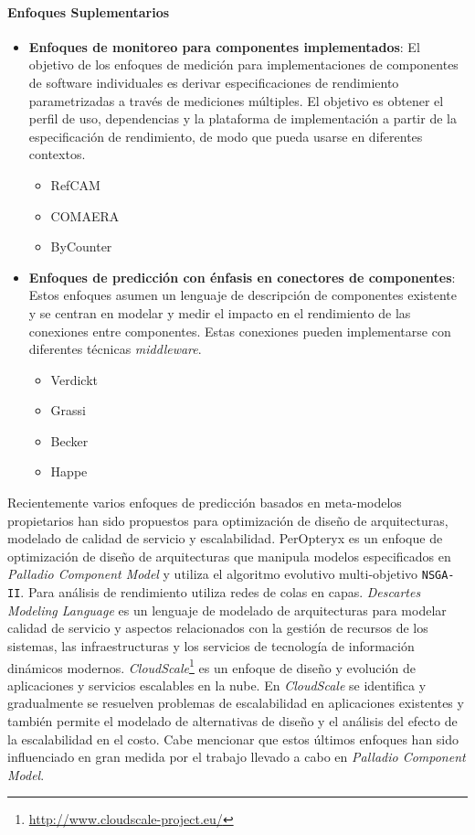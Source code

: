 \paragraph{Enfoques Suplementarios}
\begin{itemize}
    \item \textbf{Enfoques de monitoreo para componentes implementados}: El objetivo de los enfoques de medición para implementaciones de componentes de software individuales es derivar especificaciones de rendimiento parametrizadas a través de mediciones múltiples. El objetivo es obtener el perfil de uso, dependencias y la plataforma de implementación a partir de la especificación de rendimiento, de modo que pueda usarse en diferentes contextos. 
    \begin{itemize}
        \item RefCAM
        \item COMAERA
        \item ByCounter
    \end{itemize}
    \item \textbf{Enfoques de predicción con énfasis en conectores de componentes}: Estos enfoques asumen un lenguaje de descripción de componentes existente y se centran en modelar y medir el impacto en el rendimiento de las conexiones entre componentes. Estas conexiones pueden implementarse con diferentes técnicas \emph{middleware}.
    \begin{itemize}
        \item Verdickt
        \item Grassi
        \item Becker
        \item Happe
    \end{itemize}        
\end{itemize}

Recientemente varios enfoques de predicción basados en meta-modelos propietarios han sido propuestos para optimización de diseño de arquitecturas, modelado de calidad de servicio y escalabilidad. PerOpteryx\cite{Koziolek:2011:PAA:2000259.2000267} es un enfoque de optimización de diseño de arquitecturas que manipula modelos especificados en \emph{Palladio Component Model}\cite{Reussner:2016:MSS:3036121} y utiliza el algoritmo evolutivo multi-objetivo \texttt{NSGA-II}. Para análisis de rendimiento utiliza redes de colas en capas. \emph{Descartes Modeling Language}\cite{KoBrHu2014-TechReport-DML} es un lenguaje de modelado de arquitecturas para modelar calidad de servicio y aspectos relacionados con la gestión de recursos de los sistemas, las infraestructuras y los servicios de tecnología de información dinámicos modernos. \emph{CloudScale}\footnote{\url{http://www.cloudscale-project.eu/}}\cite{Brataas:2013:CSM:2479871.2479920} es un enfoque de diseño y evolución de aplicaciones y servicios escalables en la nube. En \emph{CloudScale} se identifica y gradualmente se resuelven problemas de escalabilidad en aplicaciones existentes y también permite el modelado de alternativas de diseño y el análisis del efecto de la escalabilidad en el costo. Cabe mencionar que estos últimos enfoques han sido influenciado en gran medida por el trabajo llevado a cabo en \emph{Palladio Component Model}.

